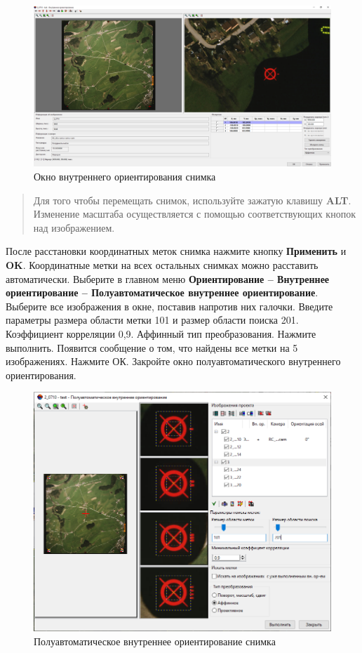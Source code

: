 \documentclass[
  12pt,
]{book}
\begin{document}
\begin{figure}
\centering
\includegraphics{images/Ref15/Interior_Orientation.png}
\caption{Окно внутреннего ориентирования снимка}
\end{figure}

\begin{quote}
Для того чтобы перемещать снимок, используйте зажатую клавишу \textbf{ALT}. Изменение масштаба осуществляется с помощью соответствующих кнопок над изображением.
\end{quote}

После расстановки координатных меток снимка нажмите кнопку \textbf{Применить} и \textbf{OK}. Координатные метки на всех остальных снимках можно расставить автоматически. Выберите в главном меню \textbf{Ориентирование -- Внутреннее ориентирование -- Полуавтоматическое внутреннее ориентирование}. Выберите все изображения в окне, поставив напротив них галочки. Введите параметры размера области метки 101 и размер области поиска 201. Коэффициент корреляции 0,9. Аффинный тип преобразования. Нажмите выполнить. Появится сообщение о том, что найдены все метки на 5 изображениях. Нажмите ОК. Закройте окно полуавтоматического внутреннего ориентирования.

\begin{figure}
\centering
\includegraphics{images/Ref15/Semi-Automate.png}
\caption{Полуавтоматическое внутреннее ориентирование снимка}
\end{figure}
\end{document}
